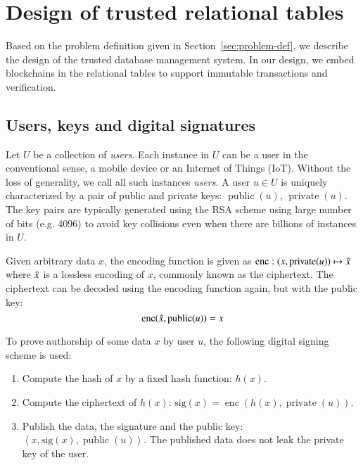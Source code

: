 \section{Design of trusted relational tables}
\label{sec:trusted-db}

Based on the problem definition given in 
Section~\ref{sec:problem-def}, we describe the design of the trusted database
management system.  In our design, we embed blockchains in the relational
tables to support immutable transactions and verification.

\subsection{Users, keys and digital signatures}

\newcommand{\public}{\operatorname{public}}
\newcommand{\private}{\operatorname{private}}
\newcommand{\enc}{\operatorname{enc}}

Let $U$ be a collection of {\em users}.  Each instance in $U$ can be a user in
the conventional sense, a mobile device or an Internet of Things (IoT).
Without the loss of generality, we call all such instances {\em users}.  A
user $u\in U$ is uniquely characterized by a pair of public and private keys:
$\public(u)$, $\private(u)$.  The key pairs are typically generated
using the RSA scheme \cite{cormen2009introduction} using large number
of bits (e.g. 4096) to avoid key collisions
even when there are billions of instances in $U$.

Given arbitrary data $x$, the encoding function is given as
$\enc: (x,\private(u))\mapsto \Hat{x}$ where $\Hat{x}$ is a lossless encoding
of $x$, commonly known as the ciphertext.  The ciphertext can be decoded using
the encoding function again, but with the public key:
$$ \enc(\Hat{x}, \public(u)) = x $$

To prove authorship of some data $x$ by user $u$, the following digital signing
scheme is used:

\begin{enumerate}
    \item Compute the hash of $x$ by a fixed hash function: $h(x)$.
    \item Compute the ciphertext of $h(x)$: $\mathrm{sig}(x) = \enc(h(x),
        \private(u))$.
    \item Publish the data, the signature and the public key:
        $\left<x, \mathrm{sig}(x), \public(u)\right>$.
        The published data does not leak the private key of the user.
\end{enumerate}

